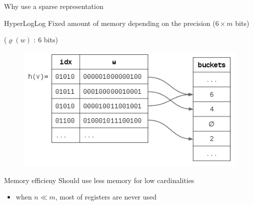 \documentclass{beamer}
\begin{document}
\begin{frame}{Why use a sparse representation}


\begin{block}{HyperLogLog}
Fixed amount of memory depending on the precision ($6\times m$ bits)

($\varrho(w)$ : 6 bits)
\end{block}

\begin{figure}[c]
\includegraphics [scale=0.4]  {hyperloglog_buckets.png}
\end{figure}


\begin{block}{Memory efficieny}
Should use less memory for low cardinalities
\begin{itemize}
\item when $n \ll m$, most of registers are never used 
\end{itemize}
\end{block}

\end{frame}

\end{document}
